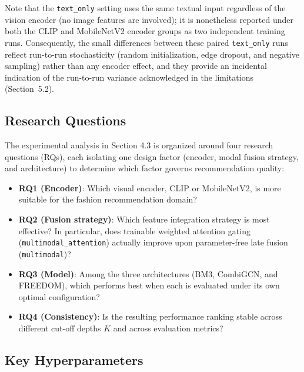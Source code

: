 Note that the \texttt{text\_only} setting uses the same textual input regardless of the vision encoder (no image features are involved); it is nonetheless reported under both the CLIP and MobileNetV2 encoder groups as two independent training runs. Consequently, the small differences between these paired \texttt{text\_only} runs reflect run-to-run stochasticity (random initialization, edge dropout, and negative sampling) rather than any encoder effect, and they provide an incidental indication of the run-to-run variance acknowledged in the limitations (Section~5.2).

\subsection{Research Questions}

The experimental analysis in Section 4.3 is organized around four research questions (RQs), each isolating one design factor (encoder, modal fusion strategy, and architecture) to determine which factor governs recommendation quality:
\begin{itemize}
    \item \textbf{RQ1 (Encoder)}: Which visual encoder, CLIP or MobileNetV2, is more suitable for the fashion recommendation domain?
    \item \textbf{RQ2 (Fusion strategy)}: Which feature integration strategy is most effective? In particular, does trainable weighted attention gating (\texttt{multimodal\_attention}) actually improve upon parameter-free late fusion (\texttt{multimodal})?
    \item \textbf{RQ3 (Model)}: Among the three architectures (BM3, CombiGCN, and FREEDOM), which performs best when each is evaluated under its own optimal configuration?
    \item \textbf{RQ4 (Consistency)}: Is the resulting performance ranking stable across different cut-off depths $K$ and across evaluation metrics?
\end{itemize}

\subsection{Key Hyperparameters}

